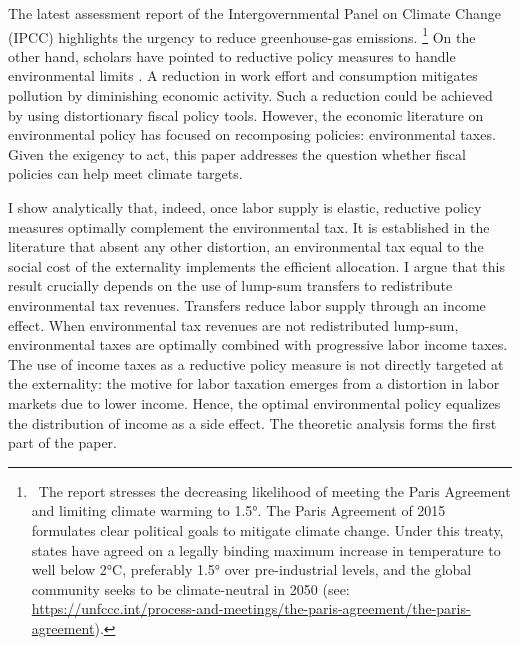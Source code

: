 The latest assessment report of the Intergovernmental Panel on Climate Change (IPCC) \citep{IPCC2022} highlights the urgency to reduce greenhouse-gas emissions.%
\footnote{ \  The report stresses the decreasing likelihood of meeting the Paris Agreement and limiting climate warming to 1.5°. The Paris Agreement of 2015 formulates clear political goals to mitigate climate change. Under this treaty, states have agreed on a legally binding maximum increase in temperature to well below 2°C, preferably 1.5° over pre-industrial levels, and the global community seeks to be climate-neutral in 2050  (see: \url{https://unfccc.int/process-and-meetings/the-paris-agreement/the-paris-agreement}). 
}
On the other hand, scholars have pointed to reductive policy measures to handle environmental limits \citep{Arrow2004AreMuch, Schor2005SustainableReduction, Dasgupta2021}. A reduction in work effort and consumption mitigates pollution by diminishing economic activity. Such a reduction could be achieved by using distortionary fiscal policy tools.
However, the economic literature on environmental policy has focused on  recomposing policies: environmental taxes. %
Given the exigency to act, this paper addresses the question whether fiscal policies can help meet climate targets.

I show analytically that, indeed, once 
labor supply is elastic, reductive policy measures optimally complement the environmental tax. 
It is established in the literature that absent any other distortion, an environmental tax equal to the social cost of the externality implements the efficient allocation. 
I argue that this result crucially depends on the use of lump-sum transfers to redistribute environmental tax revenues. Transfers reduce labor supply through an income effect. %
When environmental tax revenues are not redistributed lump-sum, environmental taxes are optimally combined with progressive labor income taxes. The use of income taxes as a reductive policy measure is not directly targeted at the externality: the motive for labor taxation emerges from a distortion in labor markets due to lower income. Hence,  %
the optimal environmental policy equalizes the distribution of income as  a side effect. The theoretic analysis forms the first part of the paper.

